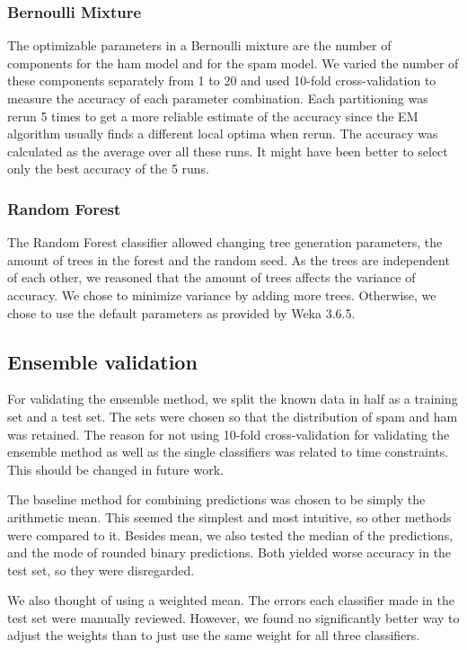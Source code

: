 \subsubsection{Bernoulli Mixture}

The optimizable parameters in a Bernoulli mixture are the number of
components for the ham model and for the spam model. We varied the
number of these components separately from 1 to 20 and used 10-fold
cross-validation to measure the accuracy of each parameter combination.
Each partitioning was rerun 5 times to get a more reliable estimate of
the accuracy since the EM algorithm usually finds a different local optima when rerun.
The accuracy was calculated as the average over all these runs.
It might have been better to select only the best accuracy of the 5 runs.

\subsubsection{Random Forest}

The Random Forest classifier allowed changing tree generation
parameters, the amount of trees in the forest and the random seed. As
the trees are independent of each other, we reasoned that the amount of
trees affects the variance of accuracy. We chose to minimize variance by
adding more trees. Otherwise, we chose to use the default parameters as
provided by Weka 3.6.5.

\subsection{Ensemble validation}

For validating the ensemble method, we split the known data in half as a
training set and a test set. The sets were chosen so that the
distribution of spam and ham was retained. The reason for not using
10-fold cross-validation for validating the ensemble method as well as
the single classifiers was related to time constraints. This should be
changed in future work.

The baseline method for combining predictions was chosen to be simply
the arithmetic mean. This seemed the simplest and most intuitive, so
other methods were compared to it. Besides mean, we also tested the
median of the predictions, and the mode of rounded binary predictions.
Both yielded worse accuracy in the test set, so they were disregarded.

We also thought of using a weighted mean. The errors each classifier
made in the test set were manually reviewed. However, we found no
significantly better way to adjust the weights than to just use the same
weight for all three classifiers.
